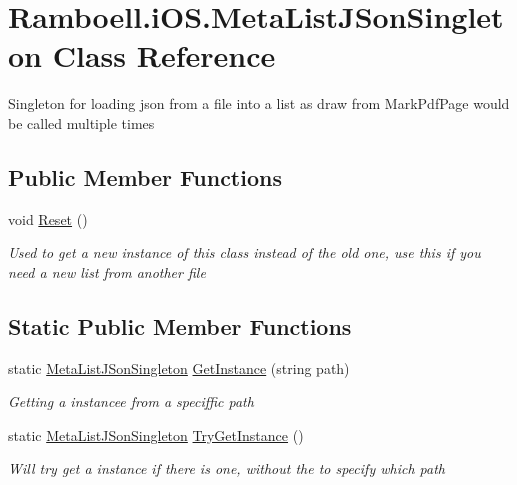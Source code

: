 \hypertarget{class_ramboell_1_1i_o_s_1_1_meta_list_j_son_singleton}{}\section{Ramboell.\+i\+O\+S.\+Meta\+List\+J\+Son\+Singleton Class Reference}
\label{class_ramboell_1_1i_o_s_1_1_meta_list_j_son_singleton}


Singleton for loading json from a file into a list as draw from Mark\+Pdf\+Page would be called multiple times  


\subsection*{Public Member Functions}
\begin{DoxyCompactItemize}
\item 
void \hyperlink{class_ramboell_1_1i_o_s_1_1_meta_list_j_son_singleton_a515bd2adaadc63f39c96b329074bf390}{Reset} ()
\begin{DoxyCompactList}\small\item\em Used to get a new instance of this class instead of the old one, use this if you need a new list from another file \end{DoxyCompactList}\end{DoxyCompactItemize}
\subsection*{Static Public Member Functions}
\begin{DoxyCompactItemize}
\item 
static \hyperlink{class_ramboell_1_1i_o_s_1_1_meta_list_j_son_singleton}{Meta\+List\+J\+Son\+Singleton} \hyperlink{class_ramboell_1_1i_o_s_1_1_meta_list_j_son_singleton_a6ccf9aa0f83d994c9e711c93fbcf17cd}{Get\+Instance} (string path)
\begin{DoxyCompactList}\small\item\em Getting a instancee from a speciffic path \end{DoxyCompactList}\item 
static \hyperlink{class_ramboell_1_1i_o_s_1_1_meta_list_j_son_singleton}{Meta\+List\+J\+Son\+Singleton} \hyperlink{class_ramboell_1_1i_o_s_1_1_meta_list_j_son_singleton_a4e654af0774fd51b8509bbcba9376a8c}{Try\+Get\+Instance} ()
\begin{DoxyCompactList}\small\item\em Will try get a instance if there is one, without the to specify which path \end{DoxyCompactList}\end{DoxyCompactItemize}
